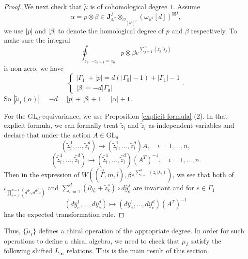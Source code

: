\documentclass[11pt]{amsart}
\theoremstyle{definition}
\theoremstyle{remark}
\numberwithin{equation}{section}
\begin{document}
\begin{proof}
    We next check that $\tilde{\mu}$ is of cohomological degree $1$.
    Assume
    $$
    \alpha=p\otimes\beta\in\mathbf{J}^{ I}_{\mathbb{A}^{d}}\otimes_{\mathcal{O}_{(\mathbb{A}^{d})^{ I}}}(\omega_{\mathbb{A}^{d}}[d])^{\boxtimes I},
    $$
    we use $|p|$ and $|\beta|$ to denote the homological degree of $p$ and $\beta$ respectively. To make sure the integral
    $$
    \oint_{z_{1},\cdots z_{n-1}=z_{n}}p\otimes\beta e^{\sum\limits_{j=1}^{n}(z_{j}|\lambda_{j})}
    $$
    is non-zero, we have
    $$
    \begin{cases}
        |\Gamma_{1}|+|p|=d(|\Gamma_{0}|-1)+|\Gamma_{1}|-1\\
        |\beta|=-d|\Gamma_{0}|
    \end{cases}.
    $$
    So $|\tilde{\mu}_{ I}(\alpha)|=-d=|p|+|\beta|+1=|\alpha|+1$.

    For the $\mathrm{GL}_d$-equivariance, we use Proposition \ref{explicit formula} (2). In that explicit formula, we can formally treat $\tilde{z}_i$ and $\bar{\tilde{z}}_i$ as independent variables and declare that under the action $A\in \mathrm{GL}_d$
$$
   (\tilde{z}^1_i,\dots,\tilde{z}^d_i)\mapsto  (\tilde{z}^1_i,\dots,\tilde{z}^d_i)A,\quad i=1,\dots,n,
   $$
   $$
(\bar{\tilde{z}}^1_i,\dots,\bar{\tilde{z}}^d_i)\mapsto  (\bar{\tilde{z}}^1_i,\dots,\bar{\tilde{z}}^d_i)(A^{T})^{-1},\quad i=1,\dots,n.
   $$
   Then in the expression of $W((\vec{\Gamma},m,l),\beta e^{\sum\limits_{i=1}^{n}(z_{i}|\lambda_{i})})$, we see that both of $\iota_{\prod_{i=1}^{n-1}(d^{d}\tilde{z}_{i}d^{d}\bar{\tilde{z}}_{i})}$ and $\sum\limits_{s=1}^{d}(\partial_{\lambda_{e}^{s}}+\tilde{z}_{e}^{s})\circ d\hat{y}_{e}^{s}$ are invariant and for $e\in \Gamma_1$
$$
(d\hat{y}_{e}^{1},\dots,d\hat{y}_{e}^{d})\mapsto(d\hat{y}_{e}^{1},\dots,d\hat{y}_{e}^{d})(A^{T})^{-1}
$$
   has the expected transformation rule.
\end{proof}


Thus, $\{\tilde \mu_I\}$ defines a chiral operation of the appropriate degree.
In order for such operations to define a chiral algebra, we need to check that $\tilde{\mu}_{ I}$ satisfy the following shifted $L_{\infty}$ relations.
This is the main result of this section.
\end{document}
